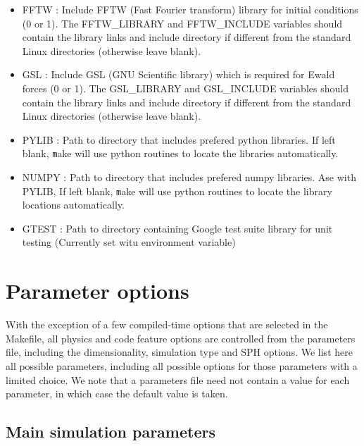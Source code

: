 \documentclass[a4paper]{article}
\newcommand{\var}[1]{\texttt{#1}}
\begin{document}
\begin{itemize}
\item FFTW : Include FFTW (Fast Fourier transform) library for initial conditions (0 or 1).  The FFTW\_LIBRARY and FFTW\_INCLUDE variables should contain the library links and include directory if different from the standard Linux directories (otherwise leave blank).

\item GSL : Include GSL (GNU Scientific library) which is required for Ewald forces (0 or 1). The GSL\_LIBRARY and GSL\_INCLUDE variables should contain the library links and include directory if different from the standard Linux directories (otherwise leave blank).

\item PYLIB : Path to directory that includes prefered python libraries.  If left blank, {\var make} will use python routines to locate the libraries automatically.

\item NUMPY : Path to directory that includes prefered numpy libraries.  Ase with PYLIB, If left blank, {\var make} will use python routines to locate the library locations automatically.

\item GTEST : Path to directory containing Google test suite library for unit testing (Currently set witu environment variable)

\end{itemize}

\newpage



\section{Parameter options} \label{S:PARAMETERS}

\noindent With the exception of a few compiled-time options that are selected in the Makefile, all physics and code feature options are controlled from the parameters file, including the dimensionality, simulation type and SPH options.  We list here all possible parameters, including all possible options for those parameters with a limited choice.  We note that a parameters file need not contain a value for each parameter, in which case the default value is taken.


\subsection{Main simulation parameters}
\end{document}
